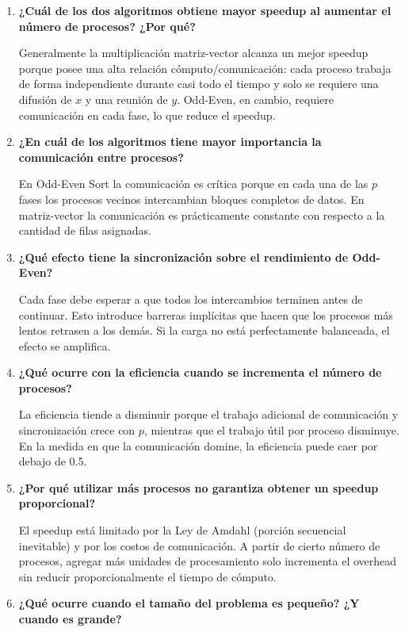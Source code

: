 \documentclass[12pt,a4paper]{article}
\begin{document}
\begin{enumerate}
    \item \textbf{¿Cuál de los dos algoritmos obtiene mayor speedup al aumentar el número de procesos? ¿Por qué?}
    
    Generalmente la multiplicación matriz-vector alcanza un mejor speedup porque posee una alta relación cómputo/comunicación: cada proceso trabaja de forma independiente durante casi todo el tiempo y solo se requiere una difusión de $x$ y una reunión de $y$. Odd-Even, en cambio, requiere comunicación en cada fase, lo que reduce el speedup.

    \item \textbf{¿En cuál de los algoritmos tiene mayor importancia la comunicación entre procesos?}
    
    En Odd-Even Sort la comunicación es crítica porque en cada una de las $p$ fases los procesos vecinos intercambian bloques completos de datos. En matriz-vector la comunicación es prácticamente constante con respecto a la cantidad de filas asignadas.

    \item \textbf{¿Qué efecto tiene la sincronización sobre el rendimiento de Odd-Even?}
    
    Cada fase debe esperar a que todos los intercambios terminen antes de continuar. Esto introduce barreras implícitas que hacen que los procesos más lentos retrasen a los demás. Si la carga no está perfectamente balanceada, el efecto se amplifica.

    \item \textbf{¿Qué ocurre con la eficiencia cuando se incrementa el número de procesos?}
    
    La eficiencia tiende a disminuir porque el trabajo adicional de comunicación y sincronización crece con $p$, mientras que el trabajo útil por proceso disminuye. En la medida en que la comunicación domine, la eficiencia puede caer por debajo de 0.5.

    \item \textbf{¿Por qué utilizar más procesos no garantiza obtener un speedup proporcional?}
    
    El speedup está limitado por la Ley de Amdahl (porción secuencial inevitable) y por los costos de comunicación. A partir de cierto número de procesos, agregar más unidades de procesamiento solo incrementa el overhead sin reducir proporcionalmente el tiempo de cómputo.

    \item \textbf{¿Qué ocurre cuando el tamaño del problema es pequeño? ¿Y cuando es grande?}
    

\end{enumerate}
\end{document}
